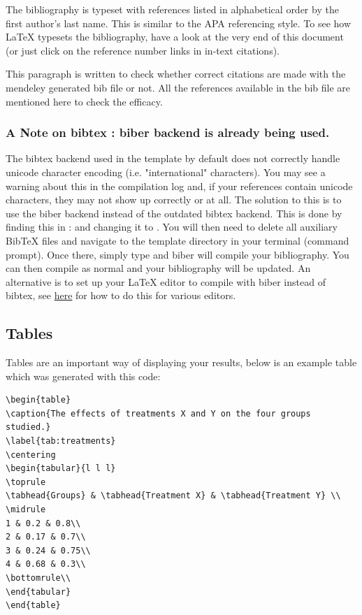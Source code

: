The bibliography is typeset with references listed in alphabetical order by the first author's last name. This is similar to the APA referencing style. To see how \LaTeX{} typesets the bibliography, have a look at the very end of this document (or just click on the reference number links in in-text citations).

This paragraph is written to check \parencite{Anjum2024, Bouteraa2024, 3blue1brown, babina2024, Dijkstra2022, Jamil2021, luckin, quantamag} whether correct citations are made with the mendeley generated bib file or not. All the references available in the bib file are mentioned here to check the efficacy.

\subsubsection{A Note on bibtex : biber backend is already being used.}

The bibtex backend used in the template by default does not correctly handle unicode character encoding (i.e. "international" characters). You may see a warning about this in the compilation log and, if your references contain unicode characters, they may not show up correctly or at all. The solution to this is to use the biber backend instead of the outdated bibtex backend. This is done by finding this in :  and changing it to . You will then need to delete all auxiliary BibTeX files and navigate to the template directory in your terminal (command prompt). Once there, simply type  and biber will compile your bibliography. You can then compile  as normal and your bibliography will be updated. An alternative is to set up your LaTeX editor to compile with biber instead of bibtex, see \href{http://tex.stackexchange.com/questions/154751/biblatex-with-biber-configuring-my-editor-to-avoid-undefined-citations/}{here} for how to do this for various editors.

\subsection{Tables}

Tables are an important way of displaying your results, below is an example table which was generated with this code:

{\small
\begin{verbatim}
\begin{table}
\caption{The effects of treatments X and Y on the four groups studied.}
\label{tab:treatments}
\centering
\begin{tabular}{l l l}
\toprule
\tabhead{Groups} & \tabhead{Treatment X} & \tabhead{Treatment Y} \\
\midrule
1 & 0.2 & 0.8\\
2 & 0.17 & 0.7\\
3 & 0.24 & 0.75\\
4 & 0.68 & 0.3\\
\bottomrule\\
\end{tabular}
\end{table}
\end{verbatim}
}

